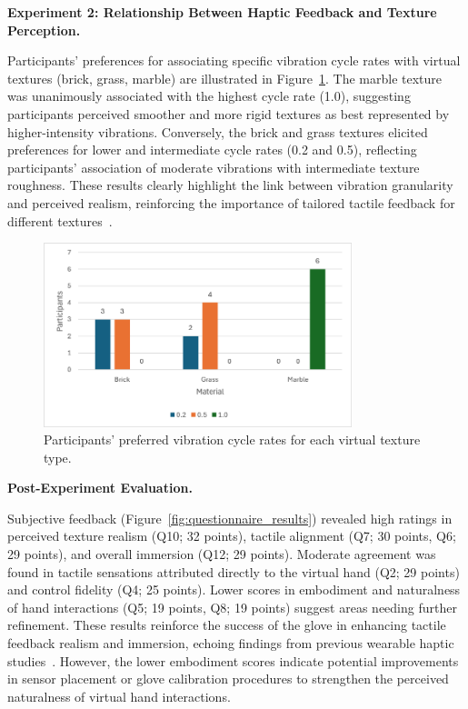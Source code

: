 \documentclass[graybox]{svmult}
\begin{document}
\textbf{Experiment 2: Relationship Between Haptic Feedback and Texture Perception.}

Participants' preferences for associating specific vibration cycle rates with virtual textures (brick, grass, marble) are illustrated in Figure~\ref{fig:ex2_results}. The marble texture was unanimously associated with the highest cycle rate (1.0), suggesting participants perceived smoother and more rigid textures as best represented by higher-intensity vibrations. Conversely, the brick and grass textures elicited preferences for lower and intermediate cycle rates (0.2 and 0.5), reflecting participants' association of moderate vibrations with intermediate texture roughness. These results clearly highlight the link between vibration granularity and perceived realism, reinforcing the importance of tailored tactile feedback for different textures~\cite{otake2022vibrotactile}.

\begin{figure}\centering
	\includegraphics[width=0.8\textwidth]{figure/ex2_result.png}%
	\caption{Participants' preferred vibration cycle rates for each virtual texture type.}\label{fig:ex2_results}
\end{figure}


\textbf{Post-Experiment Evaluation.} 

Subjective feedback (Figure~\ref{fig:questionnaire_results}) revealed high ratings in perceived texture realism (Q10; 32 points), tactile alignment (Q7; 30 points, Q6; 29 points), and overall immersion (Q12; 29 points). Moderate agreement was found in tactile sensations attributed directly to the virtual hand (Q2; 29 points) and control fidelity (Q4; 25 points). Lower scores in embodiment and naturalness of hand interactions (Q5; 19 points, Q8; 19 points) suggest areas needing further refinement. These results reinforce the success of the glove in enhancing tactile feedback realism and immersion, echoing findings from previous wearable haptic studies~\cite{pacchierotti2017wearable}. However, the lower embodiment scores indicate potential improvements in sensor placement or glove calibration procedures to strengthen the perceived naturalness of virtual hand interactions.
\end{document}
